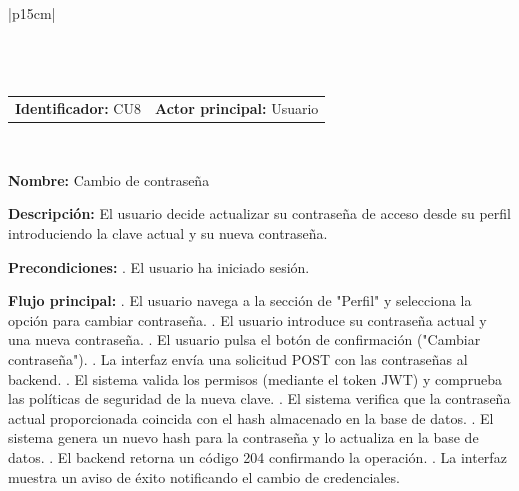 \begingroup
{}
\setlength{\arrayrulewidth}{1pt}
\begin{longtable}{|p{15cm}|}
  \hline
   \\
  \hline
  \endfirsthead
   \\
  \hline
   \\
  \hline
  \endhead
  \hline {} \\ \hline
  \endfoot
  \hline
  \caption{Caso de Uso CU8 — Cambio de contraseña.}
  \label{TB:CU8_PERFIL_PASSWORD}
  \endlastfoot

  \begin{tabularx}{\linewidth}{@{}X X@{}}
    \textbf{Identificador:} CU8 & \textbf{Actor principal:} Usuario
  \end{tabularx} \\ \hline

  \textbf{Nombre:} Cambio de contraseña \\ \hline

  \textbf{Descripción:} \newline 
  El usuario decide actualizar su contraseña de acceso desde su perfil introduciendo la clave actual y su nueva contraseña. \\ \hline

  \textbf{Precondiciones:} . El usuario ha iniciado sesión. \\ \hline

  \textbf{Flujo principal:} . El usuario navega a la sección de "Perfil" y selecciona la opción para cambiar contraseña. . El usuario introduce su contraseña actual y una nueva contraseña. . El usuario pulsa el botón de confirmación ("Cambiar contraseña"). . La interfaz envía una solicitud POST con las contraseñas al backend. . El sistema valida los permisos (mediante el token JWT) y comprueba las políticas de seguridad de la nueva clave. . El sistema verifica que la contraseña actual proporcionada coincida con el hash almacenado en la base de datos. . El sistema genera un nuevo hash para la contraseña y lo actualiza en la base de datos. . El backend retorna un código 204 confirmando la operación. . La interfaz muestra un aviso de éxito notificando el cambio de credenciales. \\ \hline


\end{longtable}
